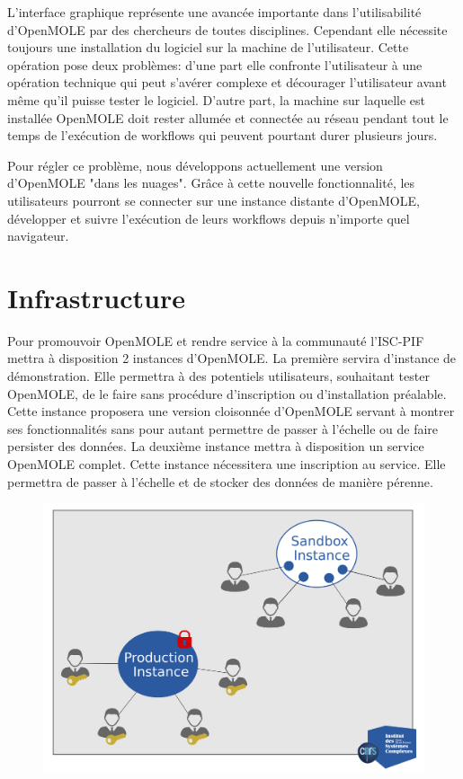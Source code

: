 \documentclass[10pt,a4paper]{article}
\begin{document}
L'interface graphique représente une avancée importante dans l'utilisabilité d'OpenMOLE par des chercheurs de toutes disciplines. Cependant elle nécessite toujours une installation du logiciel sur la machine de l'utilisateur. Cette opération pose deux problèmes: d'une part elle confronte l'utilisateur à une opération technique qui peut s'avérer complexe et décourager l'utilisateur avant même qu'il puisse tester le logiciel. D'autre part, la machine sur laquelle est installée OpenMOLE doit rester allumée et connectée au réseau pendant tout le temps de l’exécution de workflows qui peuvent pourtant durer plusieurs jours.

Pour régler ce problème, nous développons actuellement une version d'OpenMOLE "dans les nuages". Grâce à cette nouvelle fonctionnalité, les utilisateurs pourront se connecter sur une instance distante d'OpenMOLE, développer et suivre l’exécution de leurs workflows depuis n'importe quel navigateur.

\section{Infrastructure}

Pour promouvoir OpenMOLE et rendre service à la communauté l'ISC-PIF mettra à disposition 2 instances d'OpenMOLE. La première servira d'instance de démonstration. Elle permettra à des potentiels utilisateurs, souhaitant tester OpenMOLE, de le faire sans procédure d'inscription ou d'installation préalable. Cette instance proposera une version cloisonnée d'OpenMOLE servant à montrer ses fonctionnalités sans pour autant permettre de passer à l'échelle ou de faire persister des données. La deuxième instance mettra à disposition un service OpenMOLE complet. Cette instance nécessitera une inscription au service. Elle permettra de passer à l'échelle et de stocker des données de manière pérenne.

\begin{figure}[h]
 \centering
  \includegraphics[width=0.8\linewidth]{img/instances.png}
\end{figure}
\end{document}
